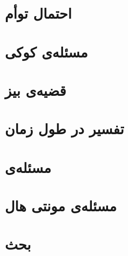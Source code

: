 \section{احتمال توأم}
\section{مسئله‌ی کوکی}
\section{قضیه‌ی بیز}
\section{تفسیر در طول زمان}
\section{مسئله‌ی }
\section{مسئله‌ی مونتی هال}
\section{بحث}

